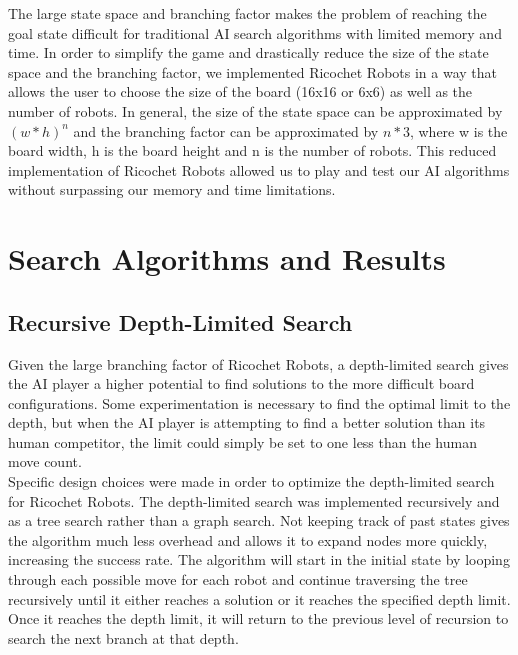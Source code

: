 \documentclass[a4paper,10pt]{article}
\begin{document}
The large state space and branching factor makes the problem of reaching the goal state difficult for traditional AI search algorithms with limited memory and time.
In order to simplify the game and drastically reduce the size of the state space and the branching factor, we implemented Ricochet Robots in a way that allows the
user to choose the size of the board (16x16 or 6x6) as well as the number of robots. In general, the size of the state space can be approximated by $(w*h)^n$ and
the branching factor can be approximated by $n*3$, where w is the board width, h is the board height and n is the number of robots.  This reduced implementation of
Ricochet Robots allowed us to play and test our AI algorithms without surpassing our memory and time limitations.


\section{Search Algorithms and Results}


  \subsection{Recursive Depth-Limited Search} \label{recursiveDFS}
  Given the large branching factor of Ricochet Robots, a depth-limited search gives the AI player a higher potential to find solutions to the more difficult board
  configurations.  Some experimentation is necessary to find the optimal limit to the depth, but when the AI player is attempting to find a better solution than
  its human competitor, the limit could simply be set to one less than the human move count.  \\

  Specific design choices were made in order to optimize the depth-limited search for Ricochet Robots.  The depth-limited search was implemented recursively and
  as a tree search rather than a graph search.  Not keeping track of past states gives the algorithm much less overhead and allows it to expand nodes more quickly,
  increasing the success rate.  The algorithm will start in the initial state by looping through each possible move for each robot and continue traversing the tree
  recursively until it either reaches a solution or it reaches the specified depth limit.  Once it reaches the depth limit, it will return to the previous level of
  recursion to search the next branch at that depth.  \\
\end{document}
